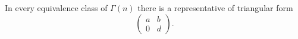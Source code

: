 In every equivalence class of $\Gamma(n)$ there is a representative of triangular form
$$\begin{pmatrix} a & b \\ 0 & d \end{pmatrix}.$$
